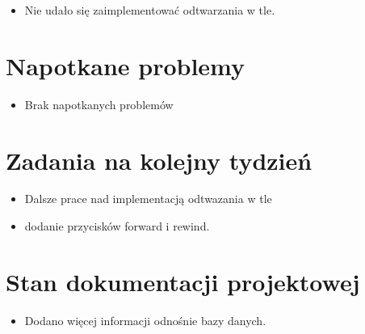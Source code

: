 \documentclass[12pt,a4paper]{mwart}
\begin{document}
\begin{itemize}
	\item Nie udało się zaimplementować odtwarzania w tle.
\end{itemize}

\section{Napotkane problemy}

\begin{itemize}
	\item Brak napotkanych problemów
\end{itemize}

\section{Zadania na kolejny tydzień}

\begin{itemize}
	\item Dalsze prace nad implementacją odtwazania w tle
	\item dodanie przycisków forward i rewind.
\end{itemize}

\section{Stan dokumentacji projektowej}
\begin{itemize}
	\item Dodano więcej informacji odnośnie bazy danych.
\end{itemize}
\end{document}
